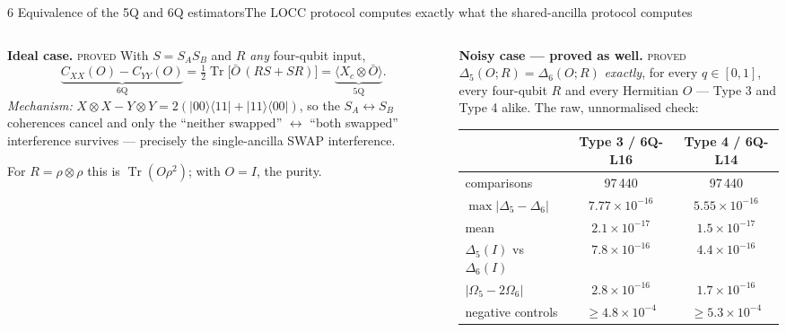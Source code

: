 \documentclass[aspectratio=169,10pt,t]{beamer}
\newcommand{\rowgap}{\addlinespace[1.2pt]}
\newcommand{\ketbra}[2]{\lvert #1 \rangle\langle #2 \rvert}
\newcommand{\avg}[1]{\langle #1 \rangle}
\newcommand{\Tr}{\operatorname{Tr}}
\newcommand{\acc}[1]{{\color{qitaccent}#1}}
\newcommand{\stat}[1]{{\scriptsize\color{qitgray}\textsc{#1}}}
\begin{document}
\begin{frame}{6 \quad Equivalence of the 5Q and 6Q estimators}{The LOCC protocol computes exactly what the shared-ancilla protocol computes}
  \footnotesize
  \vspace{0.6ex}
  \begin{columns}[T,onlytextwidth]
  \begin{column}{0.46\textwidth}\vspace{0pt}
    \textbf{Ideal case.} \stat{proved}\;
    With $S=S_AS_B$ and $R$ \emph{any} four-qubit input,
    \[
      \underbrace{C_{XX}(O)-C_{YY}(O)}_{\text{6Q}}
        =\tfrac12\Tr\!\bigl[\bar O\,(RS+SR)\bigr]
        =\underbrace{\avg{X_c\otimes\bar O}}_{\text{5Q}} .
    \]
    \emph{Mechanism:}
    $X\!\otimes\!X-Y\!\otimes\!Y=2(\ketbra{00}{11}+\ketbra{11}{00})$, so the
    $S_A\!\leftrightarrow\!S_B$ coherences cancel and only the ``neither
    swapped'' $\leftrightarrow$ ``both swapped'' interference survives ---
    precisely the single-ancilla SWAP interference.
    \smallskip

    For $R=\rho\otimes\rho$ this is $\Tr(O\rho^{2})$; with $O=I$, the purity.
  \end{column}
  \begin{column}{0.50\textwidth}\vspace{0pt}
    \textbf{Noisy case --- proved as well.} \stat{proved}\\[0.4ex]
    $\Delta_5(O;R)=\Delta_6(O;R)$ \emph{exactly}, for every $q\in[0,1]$,
    every four-qubit $R$ and every Hermitian $O$ --- Type 3 and Type 4
    alike. The raw, unnormalised check:
    \smallskip

    \centering\scriptsize
    \begin{tabular}{@{}l c c@{}}
      \toprule
       & Type 3 / 6Q-L16 & Type 4 / 6Q-L14\\
      \midrule
      comparisons                & 97\,440 & 97\,440\\\rowgap
      $\max|\Delta_5-\Delta_6|$  & \acc{$7.77\times10^{-16}$} & \acc{$5.55\times10^{-16}$}\\\rowgap
      mean                       & $2.1\times10^{-17}$ & $1.5\times10^{-17}$\\\rowgap
      $\Delta_5(I)$ vs $\Delta_6(I)$ & $7.8\times10^{-16}$ & $4.4\times10^{-16}$\\\rowgap
      $|\Omega_5-2\Omega_6|$     & $2.8\times10^{-16}$ & $1.7\times10^{-16}$\\\rowgap
      negative controls          & $\ge4.8\times10^{-4}$ & $\ge5.3\times10^{-4}$\\
      \bottomrule
    \end{tabular}
    \smallskip


\end{column}
\end{columns}
\end{frame}
\end{document}
